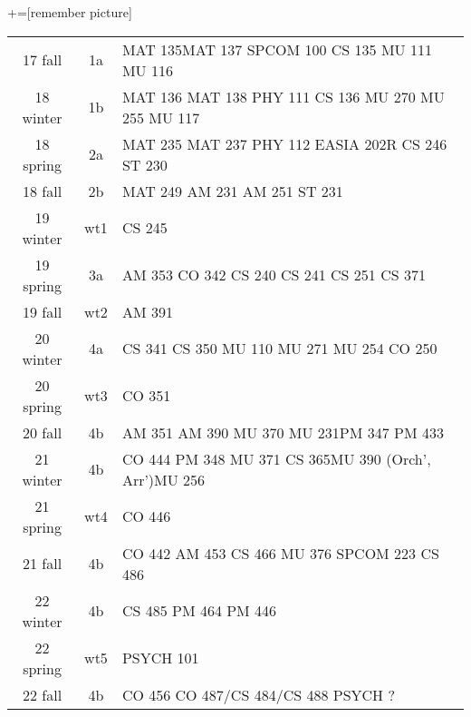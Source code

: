 \documentclass[convert]{standalone}
\begin{document}
+=[remember picture]


\begin{tabular}{|c | c | l |}
	\hline
	17 fall & 1a & MAT 135\quad MAT 137 \quad SPCOM 100 \quad CS 135 \quad MU 111 \quad MU 116 \\
	18 winter & 1b & MAT 136 \quad MAT 138 \quad PHY 111 \quad CS 136 \quad MU 270 \quad MU 255 \quad MU 117 \\
	18 spring & 2a & MAT 235 \quad MAT 237 \quad PHY 112 \quad EASIA 202R \quad CS 246 \quad ST  230 \\
	18 fall & 2b & MAT 249 \quad AM 231 \quad AM 251 \quad ST  231 \\
	19 winter & wt1 & CS 245 \\
	19 spring & 3a & AM 353 \quad CO 342 \quad CS 240 \quad CS 241 \quad CS 251 \quad CS 371 \\
	19 fall & wt2 & AM 391 \\
	20 winter & 4a & CS 341 \quad CS 350  \quad MU 110 \quad MU 271 \quad MU 254 \quad CO 250\\
	20 spring & wt3 & CO 351 \\
	20 fall & 4b & AM 351  \quad AM 390  \quad MU 370 \quad MU 231\quad PM 347 \quad PM 433  \\
	21 winter & 4b & CO 444 \quad PM 348   \quad MU 371   \quad CS 365\quad MU 390 {\tiny(Orch', Arr')}\quad MU 256\\
	21 spring & wt4 &  CO 446 \\
	21 fall & 4b & CO 442  \quad AM 453 \quad CS 466 \quad MU 376 \quad SPCOM 223 \quad CS 486  \\
	22 winter & 4b & CS 485  \quad PM 464 \quad PM 446  \\
	22 spring & wt5 & PSYCH 101\\
	22 fall & 4b & CO 456 \quad  CO 487/CS 484/CS 488  \quad PSYCH ?\\\hline

\end{tabular}
\end{document}
